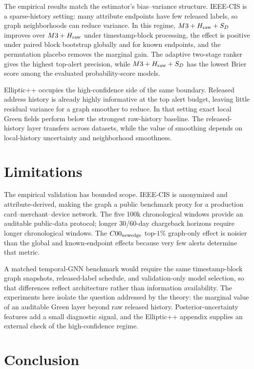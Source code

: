 \documentclass[11pt]{article}
\theoremstyle{definition}
\theoremstyle{remark}
\begin{document}
The empirical results match the estimator's bias--variance structure. IEEE-CIS is a sparse-history setting: many attribute endpoints have few released labels, so graph neighborhoods can reduce variance. In this regime, $M3+H_{\rm raw}+S_D$ improves over $M3+H_{\rm raw}$ under timestamp-block processing, the effect is positive under paired block bootstrap globally and for known endpoints, and the permutation placebo removes the marginal gain. The adaptive two-stage ranker gives the highest top-alert precision, while $M3+H_{\rm raw}+S_D$ has the lowest Brier score among the evaluated probability-score models.

Elliptic++ occupies the high-confidence side of the same boundary. Released address history is already highly informative at the top alert budget, leaving little residual variance for a graph smoother to reduce. In that setting exact local Green fields perform below the strongest raw-history baseline. The released-history layer transfers across datasets, while the value of smoothing depends on local-history uncertainty and neighborhood smoothness.

\section{Limitations}

The empirical validation has bounded scope. IEEE-CIS is anonymized and attribute-derived, making the graph a public benchmark proxy for a production card--merchant--device network. The five 100k chronological windows provide an auditable public-data protocol; longer 30/60-day chargeback horizons require longer chronological windows. The $C00_{\rm newedge}$ top-$1\%$ graph-only effect is noisier than the global and known-endpoint effects because very few alerts determine that metric.

A matched temporal-GNN benchmark would require the same timestamp-block graph snapshots, released-label schedule, and validation-only model selection, so that differences reflect architecture rather than information availability. The experiments here isolate the question addressed by the theory: the marginal value of an auditable Green layer beyond raw released history. Posterior-uncertainty features add a small diagnostic signal, and the Elliptic++ appendix supplies an external check of the high-confidence regime.

\section{Conclusion}
\end{document}
